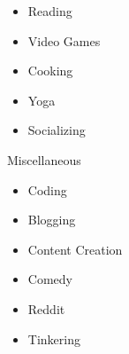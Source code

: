 \begin{minipage}{\dimexpr\textwidth-2ex}
\begin{multicols}{5}
\begin{itemize}[topsep=3pt,label=\textcolor{blue}{\textbullet},leftmargin=*]
        \item Reading
        \item Video Games
        \item Cooking
        \item Yoga
        \item Socializing
    \end{itemize}
    \columnbreak
    {\color{cblue} Miscellaneous}
    \begin{itemize}[topsep=3pt,label=\textcolor{blue}{\textbullet},leftmargin=*]
        \itemsep-0.2em 
        \item Coding
        \item Blogging
        \item Content Creation
        \item Comedy
        \item Reddit
        \item Tinkering
    \end{itemize}

\end{multicols}


\end{minipage}